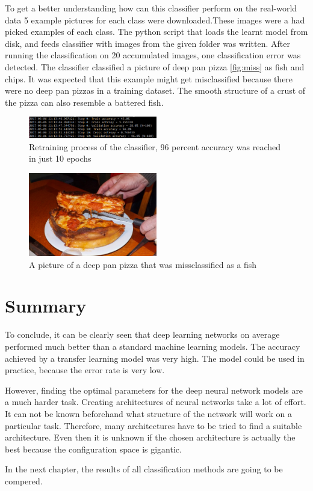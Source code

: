 To get a better understanding how can this classifier perform on the real-world data 5 example pictures for each class were downloaded.These images were a had picked examples of each class. The python script that loads the learnt model from disk, and feeds classifier with images from the given folder was written. After running the classification on 20 accumulated images, one classification error was detected. The classifier classified a picture of deep pan pizza \autoref{fig:miss} as fish and chips. It was expected that this example might get misclassified because there were no deep pan pizzas in a training dataset. The smooth structure of a crust of the pizza can also resemble a battered fish. 


\begin{figure}[h]
\centering
\includegraphics[width=0.5\textwidth]{Figures/4/term-train.PNG}
\caption{Retraining process of the classifier, 96 percent accuracy was reached in just 10 epochs}
\label{fig:retrain-2}
\end{figure}

\begin{figure}[h]
\centering
\includegraphics[width=0.5\textwidth]{Figures/4/4.jpg}
\caption{A picture of a deep pan pizza that was missclassified as a fish}
\label{fig:miss}
\end{figure}




\section{Summary}

To conclude, it can be clearly seen that deep learning networks on average performed much better than a standard machine learning models. The accuracy achieved by a transfer learning model was very high. The model could be used in practice, because the error rate is very low.

However, finding the optimal parameters for the deep neural network models are a much harder task. Creating architectures of neural networks take a lot of effort. It can not be known beforehand what structure of the network will work on a particular task. Therefore, many architectures have to be tried to find a suitable architecture. Even then it is unknown if the chosen architecture is actually the best because the configuration space is gigantic.

In the next chapter, the results of all classification methods are going to be compered.